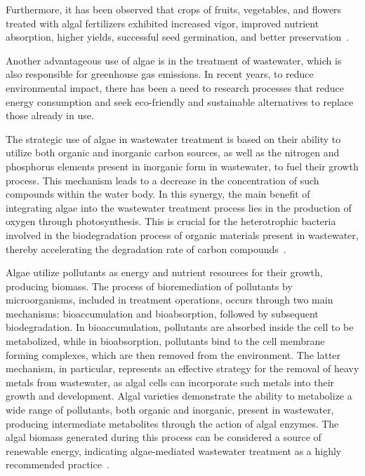 Furthermore, it has been observed that crops of fruits, vegetables, and flowers treated with algal fertilizers exhibited increased vigor, improved nutrient absorption, higher yields, successful seed germination, and better preservation~\parencite{rupawalla_Algae_2021}.

Another advantageous use of algae is in the treatment of wastewater, which is also responsible for greenhouse gas emissions. In recent years, to reduce environmental impact, there has been a need to research processes that reduce energy consumption and seek eco-friendly and sustainable alternatives to replace those already in use.

The strategic use of algae in wastewater treatment is based on their ability to utilize both organic and inorganic carbon sources, as well as the nitrogen and phosphorus elements present in inorganic form in wastewater, to fuel their growth process. This mechanism leads to a decrease in the concentration of such compounds within the water body. In this synergy, the main benefit of integrating algae into the wastewater treatment process lies in the production of oxygen through photosynthesis. This  is crucial for the heterotrophic bacteria involved in the biodegradation process of organic materials present in wastewater, thereby accelerating the degradation rate of carbon compounds~\parencite{mohsenpour_Integrating_2021}.

Algae utilize pollutants as energy and nutrient resources for their growth, producing biomass. The process of bioremediation of pollutants by microorganisms, included in treatment operations, occurs through two main mechanisms: bioaccumulation and bioabsorption, followed by subsequent biodegradation. In bioaccumulation, pollutants are absorbed inside the cell to be metabolized, while in bioabsorption, pollutants bind to the cell membrane forming complexes, which are then removed from the environment. The latter mechanism, in particular, represents an effective strategy for the removal of heavy metals from wastewater, as algal cells can incorporate such metals into their growth and development. Algal varieties demonstrate the ability to metabolize a wide range of pollutants, both organic and inorganic, present in wastewater, producing intermediate metabolites through the action of algal enzymes. The algal biomass generated during this process can be considered a source of renewable energy, indicating algae-mediated wastewater treatment as a highly recommended practice~\parencite{bhatt_Algae_2022}.

